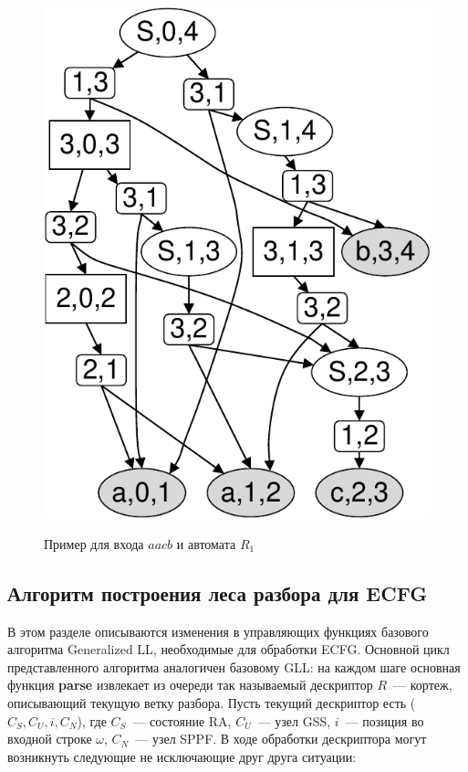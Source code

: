 \begin{figure}[ht]
{		\includegraphics[scale=.4]{./Gorohov/pictures/G0SPPFwithPackedNodes.pdf}
		\label{fig:SPPFForG0}
	}
	\caption{Пример для входа $ aacb $ и автомата $R_1$}
	\label{fig:fig2}
\end{figure}

\subsection{Алгоритм построения леса разбора для ECFG}
В этом разделе описываются изменения в управляющих функциях базового алгоритма 
Generalized LL, необходимые для обработки ECFG. Основной цикл 
представленного алгоритма аналогичен базовому
GLL: на каждом шаге основная функция \textbf{parse} извлекает из очереди так называемый дескриптор
$R$~--- кортеж, описывающий текущую ветку разбора. Пусть текущий дескриптор есть ($C_S, C_U, i, C_N$),
где $C_S$~--- состояние RA, $C_U$~--- узел GSS, $i$~--- позиция во входной строке 
$\omega$, $C_N$~--- узел SPPF. В ходе обработки дескриптора могут возникнуть следующие
не исключающие друг друга ситуации:

